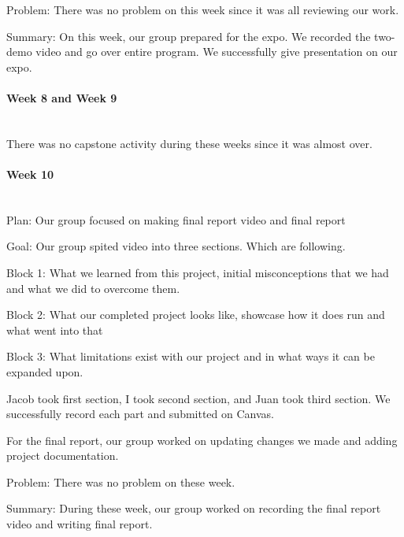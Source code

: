 \documentclass[article, onecolumn, draftclsnofoot,10pt, compsoc]{IEEEtran}
\begin{document}
Problem: There was no problem on this week since it was all reviewing our work.

Summary: On this week, our group prepared for the expo. We recorded the two-demo video and go over entire program. We successfully give presentation on our expo.

\paragraph{Week 8 and Week 9}
\mbox{}\\
There was no capstone activity during these weeks since it was almost over.

\paragraph{Week 10}
\mbox{}\\
Plan: Our group focused on making final report video and final report
 
Goal: Our group spited video into three sections. Which are following.

Block 1: What we learned from this project, initial misconceptions that we had and what we did to overcome them. 

Block 2: What our completed project looks like, showcase how it does run and what went into that

Block 3: What limitations exist with our project and in what ways it can be expanded upon.

Jacob took first section, I took second section, and Juan took third section. We successfully record each part and submitted on Canvas.

For the final report, our group worked on updating changes we made and adding project documentation.

Problem: There was no problem on these week.

Summary: During these week, our group worked on recording the final report video and writing final report.
\end{document}
